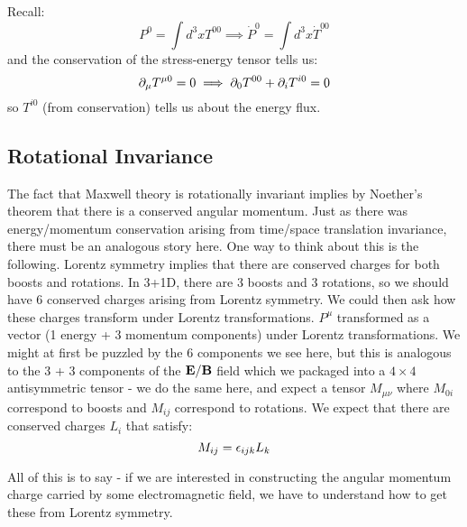 Recall:
\begin{equation}
    P^0 = \int d^3x T^{00} \implies \dot{P}^0 = \int d^3x \dot{T}^{00}
\end{equation}
and the conservation of the stress-energy tensor tells us:
\begin{equation}
    \partial_\mu T^{\mu0} = 0 \implies \partial_0 T^{00} + \partial_i T^{i0} = 0
\end{equation}
so $T^{i0}$ (from conservation) tells us about the energy flux.

\subsection{Rotational Invariance}
The fact that Maxwell theory is rotationally invariant implies by Noether's theorem that there is a conserved angular momentum. Just as there was energy/momentum conservation arising from time/space translation invariance, there must be an analogous story here. One way to think about this is the following. Lorentz symmetry implies that there are conserved charges for both boosts and rotations. In 3+1D, there are 3 boosts and 3 rotations, so we should have 6 conserved charges arising from Lorentz symmetry. We could then ask how these charges transform under Lorentz transformations. $P^\mu$ transformed as a vector (1 energy + 3 momentum components) under Lorentz transformations. We might at first be puzzled by the 6 components we see here, but this is analogous to the 3 + 3 components of the $\mathbf{E}/\mathbf{B}$ field which we packaged into a $4\times 4$ antisymmetric tensor - we do the same here, and expect a tensor $M_{\mu\nu}$ where $M_{0i}$ correspond to boosts and $M_{ij}$ correspond to rotations. We expect that there are conserved charges $L_i$ that satisfy:
\begin{equation}
    M_{ij} = \epsilon_{ijk}L_k
\end{equation}

All of this is to say - if we are interested in constructing the angular momentum charge carried by some electromagnetic field, we have to understand how to get these from Lorentz symmetry.

